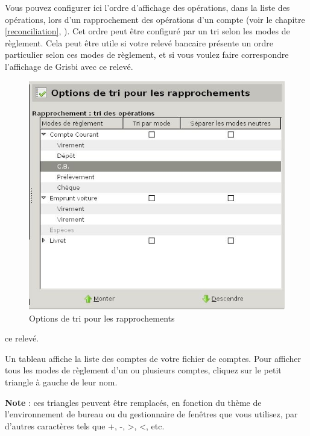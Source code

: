 Vous pouvez configurer ici l'ordre d'affichage des opérations, dans la liste des opérations, lors d'un rapprochement des opérations d'un compte (voir le chapitre \vref{reconciliation}, ). Cet ordre peut être configuré par un \gls{tri} selon les modes de règlement. Cela peut être utile si votre relevé bancaire présente un ordre particulier selon ces modes de règlement, et si vous voulez faire correspondre l'affichage de Grisbi avec \ifIllustration ce relevé.
\begin{figure}[htbp]
\begin{center}
\includegraphics[scale=0.5]{image/screenshot/setup_reconciliation_sort}
\end{center}
\caption{Options de tri pour les rapprochements}
\label{setup-reconciliation-sort-img}
\end{figure}
\else ce relevé.
\fi

Un tableau affiche la liste des comptes de votre fichier de comptes. Pour afficher tous les modes de règlement d'un ou plusieurs comptes, cliquez sur le petit triangle à gauche de leur nom.

\textbf{Note} : ces triangles peuvent être remplacés, en fonction du thème de l'environnement de bureau ou du gestionnaire de fenêtres que vous utilisez, par d'autres caractères tels que +, -, >, <, etc.

